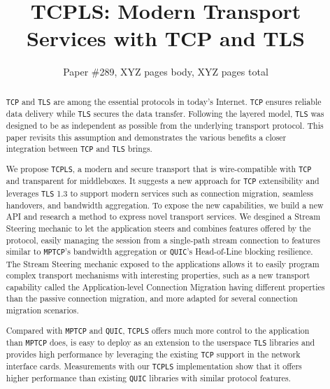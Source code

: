 \documentclass[10pt,sigconf,letterpaper,anonymous,nonacm]{acmart}
\newcommand{\tcpls}{\texttt{TCPLS}\xspace}
\newcommand{\tcp}{\texttt{TCP}\xspace}
\newcommand{\mptcp}{\texttt{MPTCP}\xspace}
\newcommand{\tls}{\texttt{TLS}\xspace}
\newcommand{\quic}{\texttt{QUIC}\xspace}
\begin{document}
\title{TCPLS: Modern Transport Services with TCP and TLS}

\author{Paper \#289, XYZ pages body, XYZ pages total}

\renewcommand{\shortauthors}{X.et al.}


\begin{abstract}
  \tcp and \tls are among the essential protocols in today's Internet. \tcp
  ensures reliable data delivery while \tls secures the data transfer.
  Following the layered model, \tls was designed to be as independent as
  possible from the underlying transport protocol. This paper revisits this
  assumption and demonstrates the various benefits a closer integration between
  \tcp and \tls brings.

  We propose \tcpls, a modern and secure transport that is wire-compatible with
  \tcp and transparent for middleboxes. It suggests a new approach for \tcp
  extensibility and leverages \tls 1.3 to support modern services such as
  connection migration, seamless handovers, and bandwidth aggregation. To expose
  the new capabilities, we build a new API and research a method to express
  novel transport services. We desgined a Stream Steering mechanic to let the
  application steers and combines features offered by the protocol, easily
  managing the session from a single-path stream connection to features similar
  to \mptcp's bandwidth aggregation or \quic's Head-of-Line blocking resilience.
  The Stream Steering mechanic exposed to the applications allows it to easily
  program complex transport mechanisms with interesting properties, such as a
  new transport capability called the Application-level Connection Migration
  having different properties than the passive connection migration, and
  more adapted for several connection migration scenarios.

  Compared with \mptcp and \quic, \tcpls offers much more control to the
  application than \mptcp does, is easy to deploy as an extension to the
  userspace \tls libraries and provides high performance by leveraging the
  existing \tcp support in the network interface cards.  Measurements with our
  \tcpls implementation show that it offers higher performance than existing \quic
  libraries with similar protocol features.

\end{abstract} \maketitle






\appendix
\label{sec:appendices}

\end{document}
